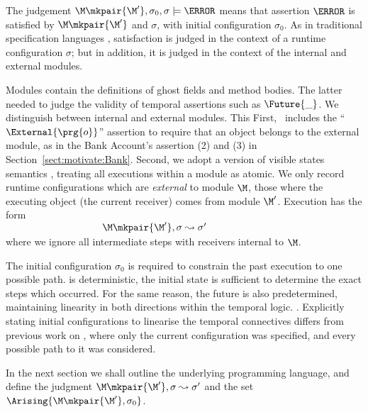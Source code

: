 The judgement $\M \mkpair  {\M'},\sigma_0 , \sigma \models \A$ means that  
assertion $\A$ is satisfied by  $\M \mkpair  {\M'}$ and $\sigma$, with initial configuration $\sigma_0$.  
As in traditional specification languages \cite{Leavens-etal07,Meyer92}, satisfaction is judged 
in the context of a runtime configuration $\sigma$; but in addition, it is judged in the context of the internal and external modules.


Modules contain the definitions of ghost fields and method bodies. The latter  needed to judge the validity of temporal assertions such as $\Future {\_}$. We distinguish between internal and external modules. This %
First, 
\Chainmail\ includes the ``$\External{\prg{o}}$'' assertion to require
that an object belongs to the external module, as in the Bank
Account's assertion (2) and (3) in
Section~\ref{sect:motivate:Bank}. Second, we adopt a version of
visible states semantics \cite{MuellerPoetzsch-HeffterLeavens06,larch93,Meyer97}, treating all
executions within a module as atomic.
We only record runtime configurations which are {\em external}
 to module $\M$, \ie those where the
 executing object (\ie the current receiver) comes from module $\M'$.
 Execution %
 has the form\\
 $~ \strut  \hspace{1.3in}    \M \mkpair  {\M'},\sigma \leadsto \sigma'$\\  
where we ignore all intermediate steps
 with receivers  internal to $\M$. 
%

The initial configuration $\sigma_0$ is required to constrain the past execution to one possible path. 
is deterministic, the initial state is sufficient to determine the exact steps which occurred. For the same reason, the future is also predetermined, maintaining linearity in both directions within the temporal logic. 
. Explicitly stating initial configurations to linearise the temporal connectives differs from previous work on \Chainmail\cite{FASE}, where only the current configuration was specified, and every possible path to it was considered.

In the next section we  shall 
outline the underlying programming language, and
define the judgment  $\M \mkpair  {\M'},\sigma \leadsto \sigma'$ and the set 
$\Arising {\M \mkpair  {\M'}, \sigma_0}$.
 



